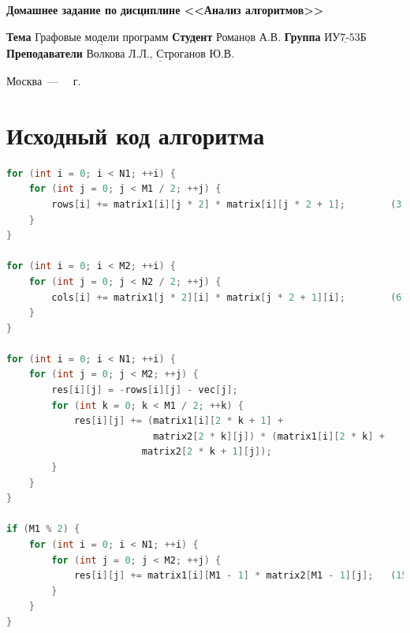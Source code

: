 \documentclass[12pt]{report}
\begin{document}
\begin{titlepage}
	
	\begin{center}
		\noindent\begin{minipage}{1.3\textwidth}\centering
			\Large\textbf{  Домашнее задание по }\newline
			\textbf{ дисциплине <<Анализ алгоритмов>>}\newline\newline
		\end{minipage}
	\end{center}
	
	\noindent\textbf{Тема} $\underline{\text{Графовые модели программ}}$\newline\newline
	\noindent\textbf{Студент} $\underline{\text{Романов А.В.}}$\newline\newline
	\noindent\textbf{Группа} $\underline{\text{ИУ7-53Б}}$\newline\newline
	\noindent\textbf{Преподаватели} $\underline{\text{Волкова Л.Л., Строганов Ю.В.}}$\newline\newline\newline
	
	\begin{center}
		\vfill
		Москва~---~\the\year
		~г.
	\end{center}
\end{titlepage}


\tableofcontents

\newpage
\chapter{Исходный код алгоритма}

\begin{lstlisting}[label=some-code,caption=Функция умножения матриц по Винограду, language=C]
for (int i = 0; i < N1; ++i) {															(1)
	for (int j = 0; j < M1 / 2; ++j) {												(2)
		rows[i] += matrix1[i][j * 2] * matrix[i][j * 2 + 1]; 		(3)
	}
}

for (int i = 0; i < M2; ++i) {															(4)
	for (int j = 0; j < N2 / 2; ++j) {												(5)
		cols[i] += matrix1[j * 2][i] * matrix[j * 2 + 1][i];		(6)
	}
}

for (int i = 0; i < N1; ++i) {															(7)
	for (int j = 0; j < M2; ++j) {														(8)
		res[i][j] = -rows[i][j] - vec[j];												(9)
		for (int k = 0; k < M1 / 2; ++k) {											(10)
			res[i][j] += (matrix1[i][2 * k + 1] +
			 			  matrix2[2 * k][j]) * (matrix1[i][2 * k] +
			  			matrix2[2 * k + 1][j]);												(11)
		}
	}
}

if (M1 % 2) {																								(12)
	for (int i = 0; i < N1; ++i) {														(13)
		for (int j = 0; j < M2; ++j) {													(14)
			res[i][j] += matrix1[i][M1 - 1] * matrix2[M1 - 1][j];	(15)
		}
	}
}
\end{lstlisting}
\end{document}
